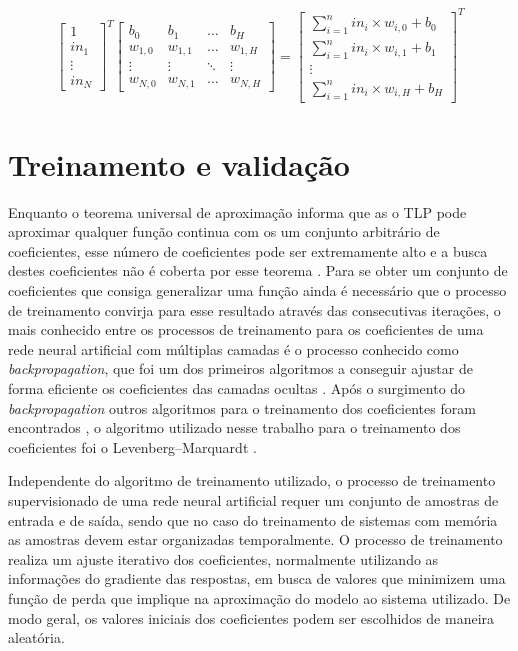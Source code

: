 \begin{align}
\begin{bmatrix}
1 \\ 
in_{1}\\ 
\vdots\\ 
in_{N}
\end{bmatrix}^{T}
\begin{bmatrix}
b_{0}   & b_{1}   & \hdots & b_{H} \\ 
w_{1,0} & w_{1,1} & \hdots & w_{1,H} \\ 
\vdots  & \vdots  & \ddots & \vdots \\ 
w_{N,0} & w_{N,1} & \hdots & w_{N,H}
\end{bmatrix}
=
\begin{bmatrix}
\sum\limits_{i=1}^{n} in_{i} \times w_{i,0} + b_{0}\\ 
\sum\limits_{i=1}^{n} in_{i} \times w_{i,1} + b_{1}\\ 
\vdots\\ 
\sum\limits_{i=1}^{n} in_{i} \times w_{i,H} + b_{H}
\end{bmatrix}^{T}
\label{eq:camada_oculta}
\end{align}

\section{Treinamento e validação} \label{sec:model-trei}
Enquanto o teorema universal de aproximação informa que as o TLP pode aproximar qualquer função continua com os um conjunto arbitrário de coeficientes, esse número de coeficientes pode ser extremamente alto e a busca destes coeficientes não é coberta por esse teorema \cite{Goodfellow-et-al-2016}. Para se obter um conjunto de coeficientes que consiga generalizar uma função ainda é necessário que o processo de treinamento convirja para esse resultado através das consecutivas iterações, o mais conhecido entre os processos de treinamento para os coeficientes de uma rede neural artificial com múltiplas camadas é o processo conhecido como \textit{backpropagation}, que foi um dos primeiros algoritmos a conseguir ajustar de forma eficiente os coeficientes das camadas ocultas \cite{Goodfellow-et-al-2016} \cite{6302929}. Após o surgimento do \textit{backpropagation} outros algoritmos para o treinamento dos coeficientes foram encontrados \cite{Khidirova2020} \cite{Escalante2006}, o algoritmo utilizado nesse trabalho para o treinamento dos coeficientes foi o Levenberg–Marquardt \cite{Marquardt1963}.

Independente do algoritmo de treinamento utilizado, o processo de treinamento supervisionado de uma rede neural artificial requer um conjunto de amostras de entrada e de saída, sendo que no caso do treinamento de sistemas com memória as amostras devem estar organizadas temporalmente. O processo de treinamento realiza um ajuste iterativo dos coeficientes, normalmente utilizando as informações do gradiente das respostas, em busca de valores que minimizem uma função de perda que implique na aproximação do modelo ao sistema utilizado. De modo geral, os valores iniciais dos coeficientes podem ser escolhidos de maneira aleatória.

